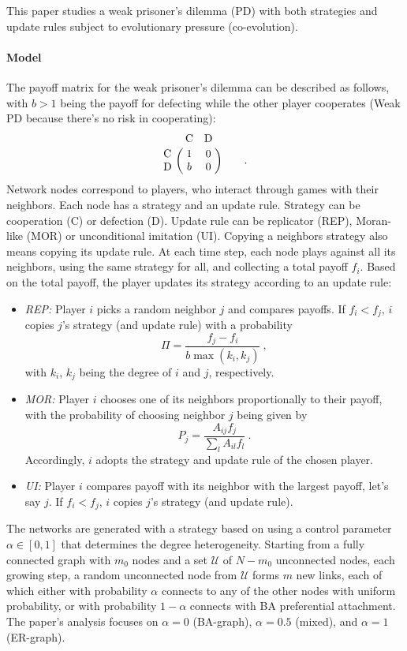 This paper studies a weak prisoner's dilemma (PD) with both strategies and update rules subject to evolutionary pressure (co-evolution).
\paragraph{Model}
The payoff matrix for the weak prisoner's dilemma can be described as follows, with $b>1$ being the payoff for defecting while the other player cooperates (Weak PD because there's no risk in cooperating):
\begin{equation}
	\bordermatrix{ & \mathrm{C} & \mathrm{D} \cr
		\mathrm{C} & 1 & 0 \cr
		\mathrm{D} & b & 0 } \qquad .
\end{equation}
Network nodes correspond to players, who interact through games with their neighbors. Each node has a strategy and an update rule. Strategy can be cooperation (C) or defection (D). Update rule can be replicator (REP), Moran-like (MOR) or unconditional imitation (UI). Copying a neighbors strategy also means copying its update rule. At each time step, each node plays against all its neighbors, using the same strategy for all, and collecting a total payoff $f_i$. Based on the total payoff, the player updates its strategy according to an update rule:
\begin{itemize}
	\item \emph{REP:} Player $i$ picks a random neighbor $j$ and compares payoffs. If $f_i < f_j$, $i$ copies $j$'s strategy (and update rule) with a probability 
	\begin{equation}
		\Pi = \frac{f_j - f_i}{b\max{(k_i, k_j)}} \ ,
	\end{equation} 
	with $k_i$, $k_j$ being the degree of $i$ and $j$, respectively.
	\item \emph{MOR:} Player $i$ chooses one of its neighbors proportionally to their payoff, with the probability of choosing neighbor $j$ being given by
	\begin{equation}
		P_j = \frac{A_{ij} f_j}{\sum_{l} A_{il} f_l} \ .
	\end{equation}
	Accordingly, $i$ adopts the strategy and update rule of the chosen player. 
	\item \emph{UI:} Player $i$ compares payoff with its neighbor with the largest payoff, let's say $j$. If $f_i < f_j$, $i$ copies $j$'s strategy (and update rule).
\end{itemize}
The networks are generated with a strategy based on \cite{Gomez-Gardenes_2006} using a control parameter $\alpha \in [0, 1]$ that determines the degree heterogeneity. Starting from a fully connected graph with $m_0$ nodes and a set $\mathcal{U}$ of $N-m_0$ unconnected nodes, each growing step, a random unconnected node from $\mathcal{U}$ forms $m$ new links, each of which either with probability $\alpha$ connects to any of the other nodes with uniform probability, or with probability $1-\alpha$ connects with BA preferential attachment. The paper's analysis focuses on $\alpha=0$ (BA-graph), $\alpha=0.5$ (mixed), and $\alpha = 1$ (ER-graph).
%
